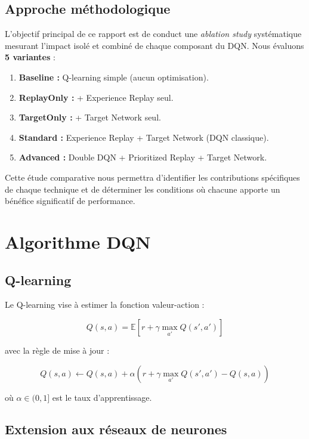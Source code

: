 \documentclass[12pt,a4paper]{article}
\begin{document}
\subsection{Approche méthodologique}

L'objectif principal de ce rapport est de conduct une \textit{ablation study} systématique mesurant l'impact isolé et combiné de chaque composant du DQN. Nous évaluons \textbf{5 variantes} :

\begin{enumerate}
    \item \textbf{Baseline :} Q-learning simple (aucun optimisation).
    \item \textbf{ReplayOnly :} + Experience Replay seul.
    \item \textbf{TargetOnly :} + Target Network seul.
    \item \textbf{Standard :} Experience Replay + Target Network (DQN classique).
    \item \textbf{Advanced :} Double DQN + Prioritized Replay + Target Network.
\end{enumerate}

Cette étude comparative nous permettra d'identifier les contributions spécifiques de chaque technique et de déterminer les conditions où chacune apporte un bénéfice significatif de performance.

\section{Algorithme DQN}

\subsection{Q-learning}

Le Q-learning vise à estimer la fonction valeur-action :

\[
Q(s,a) = \mathbb{E}\left[r + \gamma \max_{a'} Q(s',a')\right]
\]

avec la règle de mise à jour :

\[
Q(s,a) \leftarrow Q(s,a) + \alpha \left(r + \gamma \max_{a'} Q(s',a') - Q(s,a)\right)
\]

où $\alpha \in (0,1]$ est le taux d'apprentissage.

\subsection{Extension aux réseaux de neurones}
\end{document}
